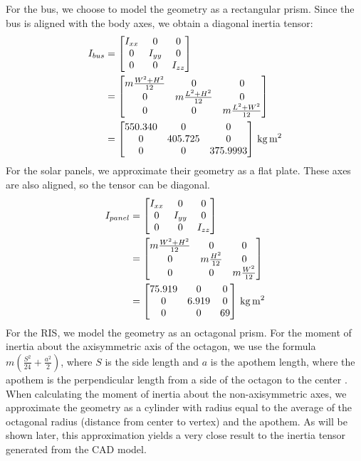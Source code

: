 For the bus, we choose to model the geometry as a rectangular prism. Since the bus is aligned with the body axes, we obtain a diagonal inertia tensor:
\begin{align*}
I_{bus} &=
\begin{bmatrix}
I_{xx} & 0 & 0 \\
0 & I_{yy} & 0 \\
0 & 0 & I_{zz}
\end{bmatrix} \\
&=
\begin{bmatrix}
m \frac{W^{2} + H^{2}}{12} & 0 & 0 \\
0 & m \frac{L^{2} + H^{2}}{12} & 0 \\
0 & 0 & m \frac{L^{2} + W^{2}}{12} 
\end{bmatrix} \\
&=
\qty[parse-numbers = false]{
\begin{bmatrix}
550.340 & 0 & 0 \\
0 & 405.725 & 0 \\
0 & 0 & 375.9993 
\end{bmatrix}
}{\kilogram\metre\squared}
\end{align*}
For the solar panels, we approximate their geometry as a flat plate. These axes are also aligned, so the tensor can be diagonal.
\begin{align*}
I_{panel} &=
\begin{bmatrix}
I_{xx} & 0 & 0 \\
0 & I_{yy} & 0 \\
0 & 0 & I_{zz}
\end{bmatrix} \\
&=
\begin{bmatrix}
m \frac{W^{2} + H^{2}}{12} & 0 & 0 \\
0 & m \frac{H^{2}}{12} & 0 \\
0 & 0 & m \frac{W^{2}}{12} 
\end{bmatrix} \\
&=
\qty[parse-numbers = false]{
\begin{bmatrix}
75.919 & 0 & 0 \\
0 & 6.919 & 0 \\
0 & 0 & 69 
\end{bmatrix}
}{\kilogram\metre\squared}
\end{align*}
For the RIS, we model the geometry as an octagonal prism. For the moment of inertia about the axisymmetric axis of the octagon, we use the formula $m \left(\frac{S^{2}}{24} + \frac{a^{2}}{2}\right)$, where $S$ is the side length and $a$ is the apothem length, where the apothem is the perpendicular length from a side of the octagon to the center \cite{McCarron}. When calculating the moment of inertia about the non-axisymmetric axes, we approximate the geometry as a cylinder with radius equal to the average of the octagonal radius (distance from center to vertex) and the apothem. As will be shown later, this approximation yields a very close result to the inertia tensor generated from the CAD model.
